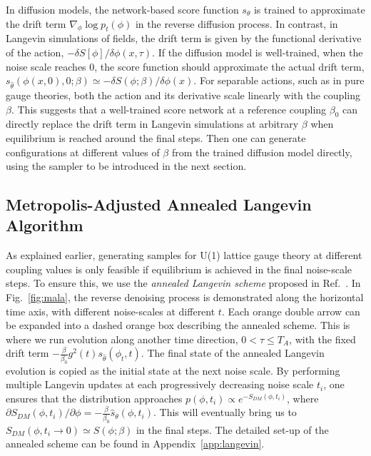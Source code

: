 \documentclass[a4paper,11pt]{article}
\begin{document}
In diffusion models, the network-based score function $s_\theta$ is trained to approximate the drift term $\nabla_{\phi}\log p_t(\phi)$ in the reverse diffusion process. In contrast, in Langevin simulations of fields, the drift term is given by the functional derivative of the action, $-{\delta S[\phi]}/{\delta \phi(x,\tau)}$. If the diffusion model is well-trained, when the noise scale reaches $0$, the score function should approximate the actual drift term, $s_{\hat{\theta}}(\phi(x,0),0;\beta) \simeq -{\delta S(\phi;\beta)}/{\delta \phi(x)}$. For separable actions, such as in pure gauge theories, both the action and its derivative scale linearly with the coupling $\beta$. 
This suggests that a well-trained score network at a reference coupling $\beta_0$ can directly replace the drift term in Langevin simulations at arbitrary $\beta$ when equilibrium is reached around the final steps. Then one can generate configurations at different values of $\beta$ from the trained diffusion model directly, using the sampler to be introduced in the next section.



\subsection{Metropolis-Adjusted Annealed Langevin Algorithm}
\label{sec:mala}

As explained earlier, generating samples for U(1) lattice gauge theory at different coupling values is only feasible if equilibrium is achieved in the final noise-scale steps. To ensure this, we use the \textit{annealed Langevin scheme} proposed in Ref.~\cite{song2019generative}. In Fig.~\ref{fig:mala}, the reverse denoising process is demonstrated along the horizontal time axis, with different noise-scales at different $t$. Each orange double arrow can be expanded into a dashed orange box describing the annealed scheme. This is where we run evolution along another time direction, $0<\tau\leq T_A$, with the fixed drift term $-\frac{\beta}{\beta_0}g^2(t) s_{\hat{\theta}}(\phi_t, t)$. The final state of the annealed Langevin evolution is copied as the initial state at the next noise scale. By performing multiple Langevin updates at each progressively decreasing noise scale $t_i$, one ensures that the distribution approaches $p(\phi,t_i) \propto e^{-S_{DM}(\phi,t_i)}$, where $\partial S_{DM}(\phi,t_i)/\partial\phi = -\frac{\beta}{\beta_0} \hat{s}_\theta(\phi,t_i)$. This will eventually bring us to $S_{DM}(\phi,t_i \rightarrow 0) \simeq S(\phi;\beta)$ in the final steps. The detailed set-up of the annealed scheme can be found in Appendix~\ref{app:langevin}.
\end{document}
